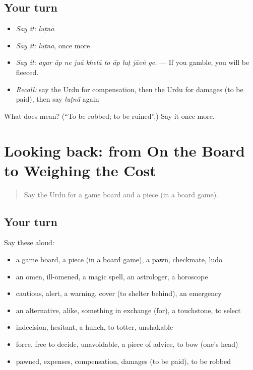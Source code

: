 \subsection*{Your turn}
\begin{itemize}
\raggedright
  \item \emph{Say it:} \emph{luṭnā}
  \item \emph{Say it:} \emph{luṭnā}, once more
  \item \emph{Say it:} \emph{agar āp ne juā khelā to āp luṭ jāeṅ ge.} — If you gamble, you will be fleeced.
  \item \emph{Recall:} say the Urdu for compensation, then the Urdu for damages (to be paid), then say \emph{luṭnā} again
\end{itemize}

\begin{tcolorbox}[breakable,colback=teal!4,colframe=teal!35!black,title={Before you move on}]
What does  mean? (\textquotedblleft{}To be robbed; to be ruined\textquotedblright{}.) Say it once more.
\end{tcolorbox}
\section[(dialogue)]{Looking back: from On the Board to Weighing the Cost}

\label{lesson:UR-R540-review-534-540}



\begin{quote}
Say the Urdu for a game board and a piece (in a board game).
\end{quote}

\subsection*{Your turn}
Say these aloud:

\begin{itemize}
\raggedright
  \item a game board, a piece (in a board game), a pawn, checkmate, ludo
  \item an omen, ill-omened, a magic spell, an astrologer, a horoscope
  \item cautious, alert, a warning, cover (to shelter behind), an emergency
  \item an alternative, alike, something in exchange (for), a touchstone, to select
  \item indecision, hesitant, a hunch, to totter, unshakable
  \item force, free to decide, unavoidable, a piece of advice, to bow (one's head)
  \item pawned, expenses, compensation, damages (to be paid), to be robbed
\end{itemize}

